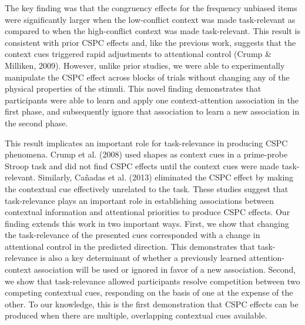 \documentclass[english,,man,floatsintext]{apa6}
\begin{document}
The key finding was that the congruency effects for the frequency
unbiased items were significantly larger when the low-conflict context
was made task-relevant as compared to when the high-conflict context was
made task-relevant. This result is consistent with prior CSPC effects
and, like the previous work, suggests that the context cues triggered
rapid adjustments to attentional control (Crump \& Milliken, 2009).
However, unlike prior studies, we were able to experimentally manipulate
the CSPC effect across blocks of trials without changing any of the
physical properties of the stimuli. This novel finding demonstrates that
participants were able to learn and apply one context-attention
association in the first phase, and subsequently ignore that association
to learn a new association in the second phase.

This result implicates an important role for task-relevance in producing
CSPC phenomena. Crump et al. (2008) used shapes as context cues in a
prime-probe Stroop task and did not find CSPC effects until the context
cues were made task-relevant. Similarly, Cañadas et al. (2013)
eliminated the CSPC effect by making the contextual cue effectively
unrelated to the task. These studies suggest that task-relevance plays
an important role in establishing associations between contextual
information and attentional priorities to produce CSPC effects. Our
finding extends this work in two important ways. First, we show that
changing the task-relevance of the presented cues corresponded with a
change in attentional control in the predicted direction. This
demonstrates that task-relevance is also a key determinant of whether a
previously learned attention-context association will be used or ignored
in favor of a new association. Second, we show that task-relevance
allowed participants resolve competition between two competing
contextual cues, responding on the basis of one at the expense of the
other. To our knowledge, this is the first demonstration that CSPC
effects can be produced when there are multiple, overlapping contextual
cues available.
\end{document}
